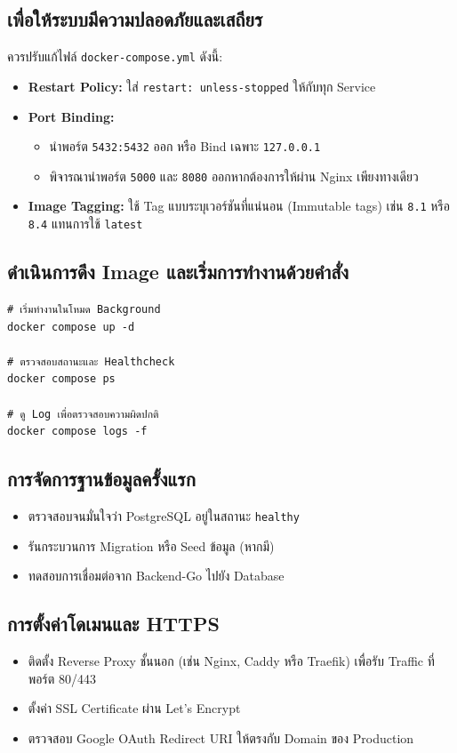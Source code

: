\subsection{เพื่อให้ระบบมีความปลอดภัยและเสถียร}
ควรปรับแก้ไฟล์ \texttt{docker-compose.yml} ดังนี้:
\begin{itemize}
    \item \textbf{Restart Policy:} ใส่ \texttt{restart: unless-stopped} ให้กับทุก Service
    \item \textbf{Port Binding:} 
    \begin{itemize}
        \item นำพอร์ต \texttt{5432:5432} ออก หรือ Bind เฉพาะ \texttt{127.0.0.1}
        \item พิจารณานำพอร์ต \texttt{5000} และ \texttt{8080} ออกหากต้องการให้ผ่าน Nginx เพียงทางเดียว
    \end{itemize}
    \item \textbf{Image Tagging:} ใช้ Tag แบบระบุเวอร์ชันที่แน่นอน (Immutable tags) เช่น \texttt{8.1} หรือ \texttt{8.4} แทนการใช้ \texttt{latest}
\end{itemize}

\subsection{ดำเนินการดึง Image และเริ่มการทำงานด้วยคำสั่ง}
\begin{verbatim}
# เริ่มทำงานในโหมด Background
docker compose up -d

# ตรวจสอบสถานะและ Healthcheck
docker compose ps

# ดู Log เพื่อตรวจสอบความผิดปกติ
docker compose logs -f
\end{verbatim}

\subsection{การจัดการฐานข้อมูลครั้งแรก}
\begin{itemize}
    \item ตรวจสอบจนมั่นใจว่า PostgreSQL อยู่ในสถานะ \texttt{healthy}
    \item รันกระบวนการ Migration หรือ Seed ข้อมูล (หากมี)
    \item ทดสอบการเชื่อมต่อจาก Backend-Go ไปยัง Database
\end{itemize}

\subsection{การตั้งค่าโดเมนและ HTTPS}
\begin{itemize}
    \item ติดตั้ง Reverse Proxy ชั้นนอก (เช่น Nginx, Caddy หรือ Traefik) เพื่อรับ Traffic ที่พอร์ต 80/443
    \item ตั้งค่า SSL Certificate ผ่าน Let’s Encrypt
    \item ตรวจสอบ Google OAuth Redirect URI ให้ตรงกับ Domain ของ Production
\end{itemize}

